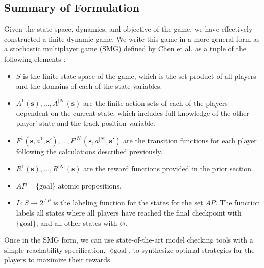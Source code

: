 \subsection{Summary of Formulation}
Given the state space, dynamics, and objective of the game, we have effectively constructed a finite dynamic game. We write this game in a more general form as a stochastic multiplayer game (SMG) defined by Chen et al. as a tuple of the following elements \cite{Chen2013}:


\begin{itemize}
    \item $S$ is the finite state space of the game, which is the set product of all players and the domains of each of the state variables.
    \item $A^1(\boldsymbol{s}), \ldots, A^{|N|}(\boldsymbol{s})$ are the finite action sets of each of the players dependent on the current state, which includes full knowledge of the other player' state and the track position variable.
    \item $F^1(\boldsymbol{s}, a^1, \boldsymbol{s}'), \ldots, F^{|N|}(\boldsymbol{s}, a^{|N|}, \boldsymbol{s}')$ are the transition functions for each player following the calculations described previously.
    \item $R^1(\boldsymbol{s}),\ldots,R^{|N|}(\boldsymbol{s})$ are the reward functions provided in the prior section.
     \item $AP = \{\text{goal}\}$ atomic propositions.
    \item $L: S \rightarrow 2^{AP}$ is the labeling function for the states for the set $AP$. The function labels all states where all players have reached the final checkpoint with $\{\text{goal}\}$, and all other states with $\varnothing$.
\end{itemize}

Once in the SMG form, we can use state-of-the-art model checking tools with a simple reachability specification, $\lozenge \text{goal}$, to synthesize optimal strategies for the players to maximize their rewards. 

